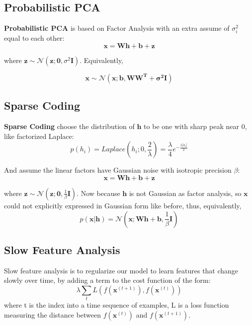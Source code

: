 \documentclass[12pt]{article}
\numberwithin{equation}{section}
\begin{document}
\subsection{Probabilistic PCA}
	\textbf{Probabilistic PCA} is based on Factor Analysis with an extra assume of $\sigma_i^2$ equal to each other:
	\begin{equation}
		\bm{x} = \bm{Wh}+\bm{b}+\bm{z}
	\end{equation} \par
	where $\bm{z} \sim \mathcal{N}(\bm{z;0,}\sigma ^2\bm{I})$. Equivalently, \par
	\begin{equation}
		\bm{x} \sim \mathcal{N}(\bm{x;b,WW^T+\sigma^2 \bm{I}})
	\end{equation} \par
\subsection{Sparse Coding}
	\textbf{Sparse Coding} choose the distribution of $\bm{h}$ to be one with sharp peak near 0, like factorized Laplace:
	\begin{equation}
		p(h_i)=Laplace(h_i;0,\frac{2}{\lambda})=\frac{\lambda}{4}e^{-\frac{\lambda |h_i|}{2}}
	\end{equation} \par
	And assume the linear factors have Gaussian noise with isotropic precision $\beta$:
	\begin{equation}
		\bm{x} = \bm{Wh}+\bm{b}+ \bm{z}
	\end{equation} \par
	where $\bm{z} \sim \mathcal{N}(\bm{z;0,} \frac{1}{\beta}\bm{I})$. Now because $\bm{h}$ is not Gaussian as factor analysis, so $\bm{x}$ could not explicitly expressed in Gaussian form like before, thus, equivalently,
	\begin{equation}
		p(\bm{x}|\bm{h}) = \mathcal{N}(\bm{x;Wh+b,}\frac{1}{\beta} \bm{I})
	\end{equation} \par	 
\subsection{Slow Feature Analysis}
	Slow feature analysis is to regularize our model to learn features that change slowly over time, by adding a term to the cost function of the form:
	\begin{equation}
		\lambda \sum_t L(f(\bm{x}^{(t+1)}),f(\bm{x}^{(t)}))
	\end{equation}
	where t is the index into a time sequence of examples, L is a loss function measuring the distance between $f(\bm{x}^{(t)})$ and $f(\bm{x}^{(t+1)})$.
\end{document}
